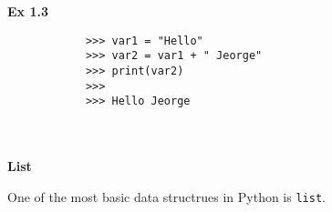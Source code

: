 \documentclass[letterpaper,11pt]{article}
\begin{document}
\\ \\
\begin{minipage}{.5\textwidth}
    \small \textbf{Ex 1.3}
    \begin{tcolorbox}
        \begin{footnotesize}
            \begin{verbatim}
            >>> var1 = "Hello"
            >>> var2 = var1 + " Jeorge"
            >>> print(var2)    
            >>>
            >>> Hello Jeorge
            \end{verbatim}
        \end{footnotesize}
    \end{tcolorbox}
\end{minipage}
\\ \\ 
\textbf{List}
\par{One of the most basic data structrues in Python is \texttt{list}. } 
\end{document}
